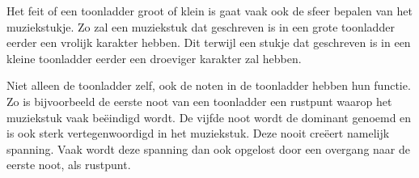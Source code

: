 Het feit of een toonladder groot of klein is gaat vaak ook de sfeer bepalen van het muziekstukje. Zo zal een muziekstuk dat geschreven is in een grote toonladder eerder een vrolijk karakter hebben. Dit terwijl een stukje dat geschreven is in een kleine toonladder eerder een droeviger karakter zal hebben. 

Niet alleen de toonladder zelf, ook de noten in de toonladder hebben hun functie. Zo is bijvoorbeeld de eerste noot van een toonladder een rustpunt waarop het muziekstuk vaak be\"eindigd wordt. De vijfde noot wordt de dominant genoemd en is ook sterk vertegenwoordigd in het muziekstuk. Deze nooit cre\"eert namelijk spanning. Vaak wordt deze spanning dan ook opgelost door een overgang naar de eerste noot, als rustpunt.


